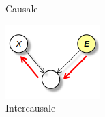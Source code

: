 \begin{figure}[!ht]
\begin{subfigure}[b]{0.14\textwidth}
        \caption{Causale}
        \label{fig:causale}
    \end{subfigure}
    \hfill
    \begin{subfigure}[b]{0.26\textwidth}
        \includegraphics[width=\textwidth]{./img/Reti/Intercausale.png}
        \caption{Intercausale}
        \label{fig:intercausale}
    \end{subfigure}
    \hfill
    \begin{subfigure}[b]{0.14\textwidth}

\end{subfigure}
\end{figure}
